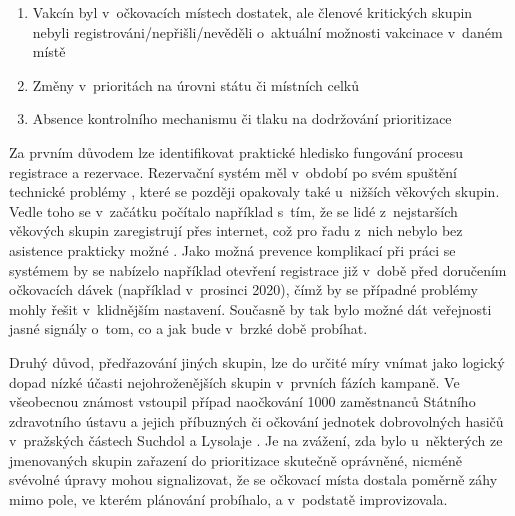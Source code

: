 \begin{enumerate}
\item Vakcín byl v~očkovacích místech dostatek, ale členové kritických skupin nebyli registrováni/nepřišli/nevěděli o~aktuální možnosti vakcinace v~daném místě \cite{logo_nahoda, lochar_karban} 
\item Změny v~prioritách na úrovni státu či místních celků \cite{logo_logistika, logo_pardubice}
\item Absence kontrolního mechanismu či tlaku na dodržování prioritizace \cite{logo_predbihani, lochar_karban}
\end{enumerate}


Za prvním důvodem lze identifikovat praktické hledisko fungování procesu registrace a rezervace.
Rezervační systém měl v~období po svém spuštění technické problémy \cite{logoc_seniori_zapsani, logoc_stres}, které se později opakovaly také u~nižších vě\-ko\-vých skupin. 
Vedle toho se v~začátku počítalo například s~tím, že se lidé z~nejstarších věkových skupin zaregistrují přes internet, což pro řadu z~nich nebylo bez asistence prakticky možné \cite{seniori_registrace_internet}.
%
Jako možná prevence komplikací při práci se systémem by se nabízelo například otevření registrace již v~době před doručením očkovacích dávek (například v~prosinci 2020), čímž by se případné problémy mohly řešit v~klidnějším nastavení. %
Současně by tak bylo možné dát veřejnosti jasné signály o~tom, co a jak bude v~brzké době probíhat.

Druhý důvod, předřazování jiných skupin, lze do určité míry vnímat jako logický dopad nízké účasti nejohroženějších skupin v~prvních fázích kampaně.
%
Ve všeobecnou známost vstoupil případ naočkování 1000 zaměstnanců Státního zdravotního ústavu a jejich příbuzných či očkování jednotek dobrovolných hasičů v~pražských částech Such\-dol a Lysolaje \cite{logoc_nebudu, logoc_hasici}. Je na zvážení, zda bylo u~ně\-kte\-rých ze jmenovaných skupin zařazení do prioritizace skutečně oprávněné, nicméně svévolné úpravy mohou signalizovat, že se očkovací místa dostala poměrně záhy mimo pole, ve kterém plánování probíhalo, a v~podstatě improvizovala. 

